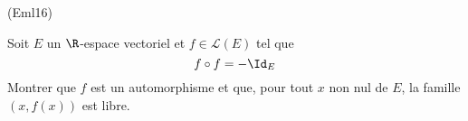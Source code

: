 \begin{tiny}(Eml16)\end{tiny} Soit $E$ un $\R$-espace vectoriel et $f\in \mathcal{L}(E)$ tel que
\begin{displaymath}
  f\circ f = -\Id_E
\end{displaymath}
Montrer que $f$ est un automorphisme et que, pour tout $x$ non nul de $E$, la famille $(x,f(x))$ est libre.